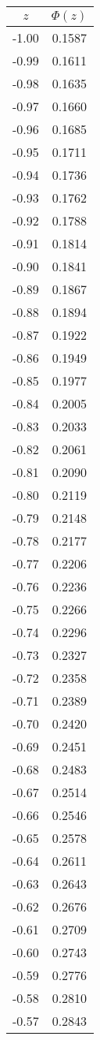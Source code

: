 \begin{tabular}{|c|c|}\hline
$z$ & $\Phi(z)$ \\ \hline
-1.00 & 0.1587\\
-0.99 & 0.1611\\
-0.98 & 0.1635\\
-0.97 & 0.1660\\
-0.96 & 0.1685\\
-0.95 & 0.1711\\
-0.94 & 0.1736\\
-0.93 & 0.1762\\
-0.92 & 0.1788\\
-0.91 & 0.1814\\
-0.90 & 0.1841\\
-0.89 & 0.1867\\
-0.88 & 0.1894\\
-0.87 & 0.1922\\
-0.86 & 0.1949\\
-0.85 & 0.1977\\
-0.84 & 0.2005\\
-0.83 & 0.2033\\
-0.82 & 0.2061\\
-0.81 & 0.2090\\
-0.80 & 0.2119\\
-0.79 & 0.2148\\
-0.78 & 0.2177\\
-0.77 & 0.2206\\
-0.76 & 0.2236\\
-0.75 & 0.2266\\
-0.74 & 0.2296\\
-0.73 & 0.2327\\
-0.72 & 0.2358\\
-0.71 & 0.2389\\
-0.70 & 0.2420\\
-0.69 & 0.2451\\
-0.68 & 0.2483\\
-0.67 & 0.2514\\
-0.66 & 0.2546\\
-0.65 & 0.2578\\
-0.64 & 0.2611\\
-0.63 & 0.2643\\
-0.62 & 0.2676\\
-0.61 & 0.2709\\
-0.60 & 0.2743\\
-0.59 & 0.2776\\
-0.58 & 0.2810\\
-0.57 & 0.2843\\

\end{tabular}
